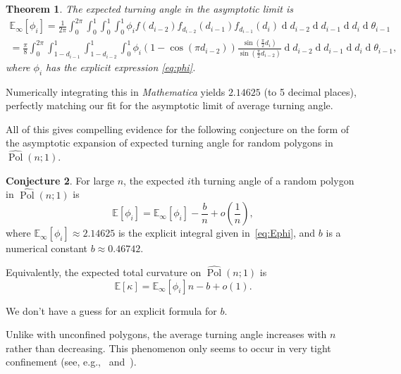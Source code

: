 \documentclass{article}
\newtheorem{theorem}{Theorem}
\theoremstyle{definition}
\newtheorem{conjecture}[theorem]{Conjecture}
\newcommand{\Polhat}{\widehat{\operatorname{Pol}}}
\begin{document}
	\begin{theorem}\label{thm:asymptotic turning angle}
		The expected turning angle in the asymptotic limit is
			\begin{multline}\label{eq:Ephi}
				\mathbb{E}_\infty[\phi_i] = \frac{1}{2\pi} \int_0^{2\pi}\!\!\!\!\int_0^1\!\!\! \int_0^1\!\!\!\int_0^1\!  \phi_i f(d_{i-2})f_{d_{i-2}}(d_{i-1}) f_{d_{i-1}}(d_i)   \operatorname{d}\!d_{i-2} \operatorname{d}\!d_{i-1} \operatorname{d}\!d_i\operatorname{d}\!\theta_{i-1} \\
				= \frac{\pi}{8} \int_0^{2\pi}\!\!\!\!\int_{1-d_{i-1}}^1\! \int_{1-d_{i-2}}^1\!\int_0^1\!  \phi_i (1-\cos(\pi d_{i-2}))  \frac{\sin\left(\frac{\pi}{2}d_{i}\right)}{\sin\left(\frac{\pi}{2}d_{i-2}\right)} \operatorname{d}\!d_{i-2} \operatorname{d}\!d_{i-1} \operatorname{d}\!d_i\operatorname{d}\!\theta_{i-1},
			\end{multline}
			where $\phi_i$ has the explicit expression \eqref{eq:phi}.
	\end{theorem}
	
	Numerically integrating this in \emph{Mathematica} yields $2.14625$ (to 5 decimal places), perfectly matching our fit for the asymptotic limit of average turning angle.

	All of this gives compelling evidence for the following conjecture on the form of the asymptotic expansion of expected turning angle for random polygons in $\Polhat(n;1)$.

	\begin{conjecture}\label{conj:turning angle}
		For large $n$, the expected $i$th turning angle of a random polygon in $\Polhat(n;1)$ is
		\[
			\mathbb{E}[\phi_i] = \mathbb{E}_\infty[\phi_i] - \frac{b}{n} + o\left(\frac{1}{n}\right),
		\]
		where $\mathbb{E}_\infty[\phi_i] \approx 2.14625$ is the explicit integral given in~\eqref{eq:Ephi}, and $b$ is a numerical constant $b \approx 0.46742$.
		
		Equivalently, the expected total curvature on $\Polhat(n;1)$ is
		\[
			\mathbb{E}[\kappa] = \mathbb{E}_\infty[\phi_i]n - b + o(1).
		\]
	\end{conjecture}

	We don't have a guess for an explicit formula for $b$.

	Unlike with unconfined polygons, the average turning angle increases with $n$ rather than decreasing. This phenomenon only seems to occur in very tight confinement (see, e.g.,~\cite[Figure~12]{cantarellaSymplecticGeometryClosed2016} and~\cite[Sections~5.1--5.2]{diaoTotalCurvatureTotal2018}).
	
\end{document}
